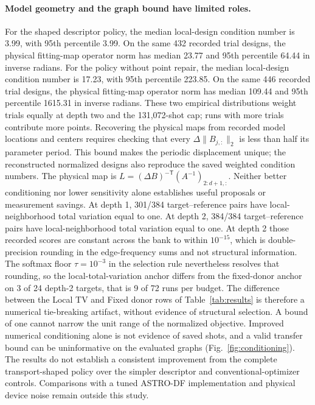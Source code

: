 \paragraph{Model geometry and the graph bound have limited roles.}
For the shaped descriptor policy, the median local-design condition number is 3.99, with 95th percentile 3.99.
On the same 432 recorded trial designs, the physical fitting-map operator norm has median 23.77 and 95th percentile 64.44 in inverse radians.
For the policy without point repair, the median local-design condition number is 17.23, with 95th percentile 223.85.
On the same 446 recorded trial designs, the physical fitting-map operator norm has median 109.44 and 95th percentile 1615.31 in inverse radians.
These two empirical distributions weight trials equally at depth two and the 131,072-shot cap; runs with more trials contribute more points. Recovering the physical maps from recorded model locations and centers requires checking that every $\Delta\|B_{j,:}\|_2$ is less than half its parameter period. This bound makes the periodic displacement unique; the reconstructed normalized designs also reproduce the saved weighted condition numbers. The physical map is $L=(\Delta B)^{-\mathsf T}(A^{-1})_{2:d+1,:}$. Neither better conditioning nor lower sensitivity alone establishes useful proposals or measurement savings.
At depth 1, 301/384 target--reference pairs have local-neighborhood total variation equal to one.
At depth 2, 384/384 target--reference pairs have local-neighborhood total variation equal to one.
At depth 2 those recorded scores are constant across the bank to within $10^{-15}$, which is double-precision rounding in the edge-frequency sums and not structural information. The softmax floor $\tau=10^{-3}$ in the selection rule nevertheless resolves that rounding, so the local-total-variation anchor differs from the fixed-donor anchor on 3 of 24 depth-2 targets, that is 9 of 72 runs per budget. The difference between the Local TV and Fixed donor rows of Table~\ref{tab:results} is therefore a numerical tie-breaking artifact, without evidence of structural selection.
A bound of one cannot narrow the unit range of the normalized objective. Improved numerical conditioning alone is not evidence of saved shots, and a valid transfer bound can be uninformative on the evaluated graphs (Fig.~\ref{fig:conditioning}). The results do not establish a consistent improvement from the complete transport-shaped policy over the simpler descriptor and conventional-optimizer controls. Comparisons with a tuned ASTRO-DF implementation and physical device noise remain outside this study.
